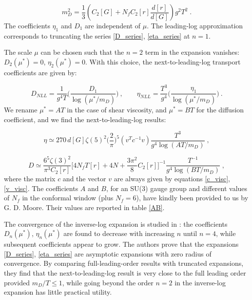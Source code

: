  \begin{equation}
 m_D^2 =  \frac{1}{3} \left(C_2[G] + N_f C_2[r]\frac{d[r]}{d[G]}  \right)g^2 T^2 \; .
\label{Debye_mass} 
\end{equation}
%
The coefficients $\eta_1$ and $D_1$ are independent of $\mu$. The leading-log approximation corresponds to truncating the series \ref{D_series}, \ref{eta_series} at $n=1$.

The scale $\mu$ can be chosen such that the $n=2$ term in the expansion vanishes: $D_2(\mu^*) = 0$, $\eta_2(\mu^*) =0$. With this choice, the next-to-leading-log transport coefficients are given by:

\begin{equation}
D_{NLL} = \frac{1}{g^4 T} \biggl( \frac{D_1}{ \log(\mu^*/m_D)} \biggr) \: , \qquad
\eta_{NLL} = \frac{T^3}{g^4} \biggl( \frac{\eta_1}{ \log(\mu^*/m_D)} \biggr) \: .
\end{equation} 
%
We rename $\mu^* = AT$ in the case of shear viscosity, and $\mu^* = BT$ for the diffusion coefficient, and we find the next-to-leading-log results:

 \begin{equation}   
\eta \simeq 270 \, d [G] \zeta(5)^2 \biggl( \frac{2}{\pi} \biggr)^5 (v^T c^{-1} v) \frac{T^3}{g^4 \log( AT/m_D)} \; ,
\label{eta_NLL}
\end{equation}

\begin{equation}
D \simeq \frac{6^5 \zeta(3)^2}{\pi^3 C_2[r]} \biggl[ 4 N_f T[r] + 4 N + \frac{3 \pi^2}{8} C_2[r] \biggr]^{-1} 
 \frac{T^{-1}}{g^4\log(BT/m_D)} \; ,
 \label{D_NLL}
\end{equation}
%
where the matrix $c$ and the vector $v$ are always given by equations \ref{c_visc}, \ref{v_visc}. The coefficients $A$ and $B$, for an SU(3) gauge group and different values of $N_f$ in the conformal window (plus $N_f = 6$), have kindly been provided to us by G. D. Moore. Their values are reported in table \ref{AB}.

The convergence of the inverse-log expansion is studied in \cite{Arnold:2003zc}: the coefficients $D_n(\mu^*)$, $\eta_n(\mu^*)$ are found to decrease with increasing $n$ until $n=4$, while subsequent coefficients appear to grow. The authors prove that the expansions \ref{D_series}, \ref{eta_series} are asymptotic expansions with zero radius of convergence. By comparing full-leading-order results with truncated expansions, they find that the next-to-leading-log result is very close to the full leading order provided $m_D/T \leq 1$, while going beyond the order $n=2$ in the inverse-log expansion has little practical utility.

